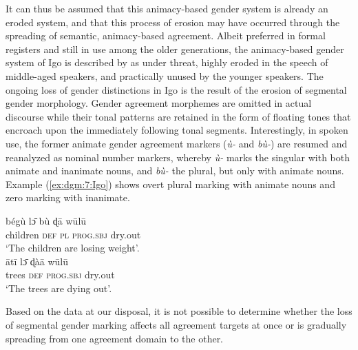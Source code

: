 \documentclass[output=collectionpaper]{langsci/langscibook}
\begin{document}
It can thus be assumed that this animacy-based gender system is already an eroded system, and that this process of erosion may have occurred through the spreading of semantic, animacy-based agreement. Albeit preferred in formal registers and still in use among the older generations, the animacy-based gender system of Igo is described by \citet{Gblem-Poidi2007} as under threat, highly eroded in the speech of middle-aged speakers, and practically unused by the younger speakers. The ongoing loss of gender distinctions in Igo is the result of the erosion of segmental gender morphology. Gender agreement morphemes are omitted in actual discourse while their tonal patterns are retained in the form of floating tones that encroach upon the immediately following tonal segments. Interestingly, in spoken use, the former animate gender agreement markers (\textit{\`u-} and \textit{b\`u-}) are resumed and reanalyzed as nominal number markers, whereby \textit{\`u-} marks the singular with both animate and inanimate nouns, and \textit{b\`u-} the plural, but only with animate nouns. Example (\ref{ex:dgm:7:Igo}) shows overt plural marking with animate nouns and zero marking with inanimate.

\ea\label{ex:dgm:7:Igo}
\ea
\gll b\'eg\`u l\={ɔ} b\`u ɖ\={a} w\={u}l\={u}\\
children \textsc{def} \textsc{pl} \textsc{prog.sbj} dry.out\\
\glt `The children are losing weight'.\\
\ex
\gll \={a}t\={i} l\={ɔ} ɖ\`a\={a} w\={u}l\={u}\\
trees \textsc{def} \textsc{prog.sbj} dry.out \\
\glt `The trees are dying out'.
\z
\z

Based on the data at our disposal, it is not possible to determine whether the loss of segmental gender marking affects all agreement targets at once or is gradually spreading from one agreement domain to the other.
\end{document}
